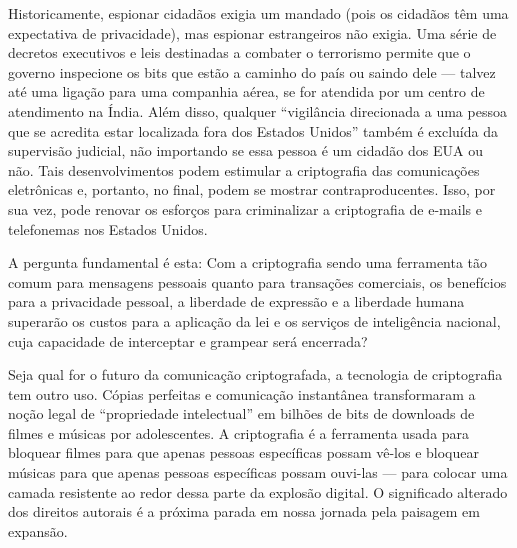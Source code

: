 \documentclass{book}
\begin{document}
Historicamente, espionar cidadãos exigia um mandado (pois os cidadãos têm uma expectativa de privacidade), mas espionar estrangeiros não exigia. Uma série de decretos executivos e leis destinadas a combater o terrorismo permite que o governo inspecione os bits que estão a caminho do país ou saindo dele --- talvez até uma ligação para uma companhia aérea, se for atendida por um centro de atendimento na Índia. Além disso, qualquer ``vigilância direcionada a uma pessoa que se acredita estar localizada fora dos Estados Unidos'' também é excluída da supervisão judicial, não importando se essa pessoa é um cidadão dos EUA ou não. Tais desenvolvimentos podem estimular a criptografia das comunicações eletrônicas e, portanto, no final, podem se mostrar contraproducentes. Isso, por sua vez, pode renovar os esforços para criminalizar a criptografia de e-mails e telefonemas nos Estados Unidos.

A pergunta fundamental é esta: Com a criptografia sendo uma ferramenta tão comum para mensagens pessoais quanto para transações comerciais, os benefícios para a privacidade pessoal, a liberdade de expressão e a liberdade humana superarão os custos para a aplicação da lei e os serviços de inteligência nacional, cuja capacidade de interceptar e grampear será encerrada?

Seja qual for o futuro da comunicação criptografada, a tecnologia de criptografia tem outro uso. Cópias perfeitas e comunicação instantânea transformaram a noção legal de ``propriedade intelectual'' em bilhões de bits de downloads de filmes e músicas por adolescentes. A criptografia é a ferramenta usada para bloquear filmes para que apenas pessoas específicas possam vê-los e bloquear músicas para que apenas pessoas específicas possam ouvi-las --- para colocar uma camada resistente ao redor dessa parte da explosão digital. O significado alterado dos direitos autorais é a próxima parada em nossa jornada pela paisagem em expansão.
\end{document}
